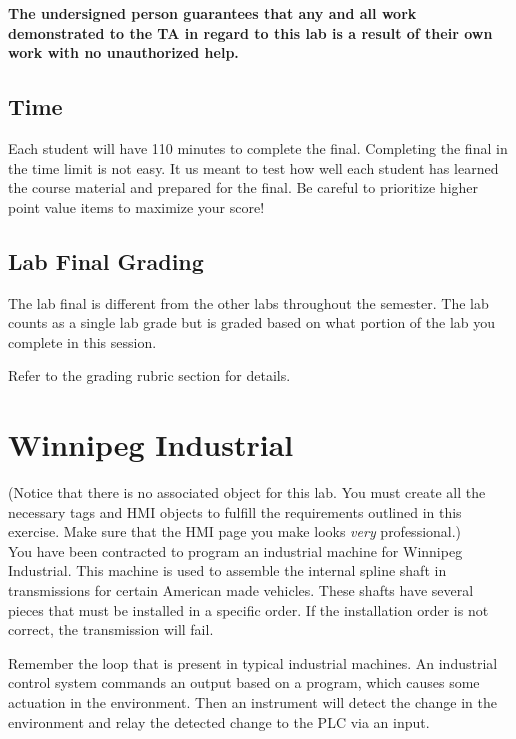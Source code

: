 \textbf{The undersigned person guarantees that any and all work demonstrated to the TA in regard to this lab is a result of their own work with no unauthorized help.}


\subsection{Time}

Each student will have 110 minutes to complete the final. Completing the final in the time limit is not easy. It us meant to test how well each student has learned the course material and prepared for the final. Be careful to prioritize higher point value items to maximize your score!


\subsection{Lab Final Grading}

The lab final is different from the other labs throughout the semester. The lab counts as a single lab grade but is graded based on what portion of the lab you complete in this session. 

Refer to the grading rubric section for details.





\section{Winnipeg Industrial}
(Notice that there is no associated object for this lab. You must create all the necessary tags and HMI objects to fulfill the requirements outlined in this exercise. Make sure that the HMI page you make looks \textit{very} professional.)
\\

You have been contracted to program an industrial machine for Winnipeg Industrial. This machine is used to assemble the internal spline shaft in transmissions for certain American made vehicles. These shafts have several pieces that must be installed in a specific order. If the installation order is not correct, the transmission will fail.

Remember the loop that is present in typical industrial machines. An industrial control system commands an output based on a program, which causes some actuation in the environment. Then an instrument will detect the change in the environment and relay the detected change to the PLC via an input. 


